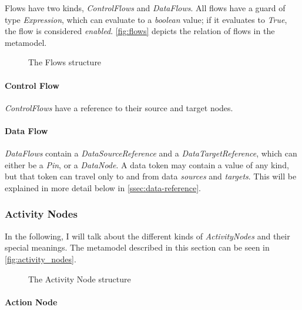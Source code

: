 Flows have two kinds, \emph{ControlFlows} and \emph{DataFlows}. All flows have a guard of type \emph{Expression}, which can evaluate to a \emph{boolean} value; if it evaluates to \emph{True}, the flow is considered \emph{enabled}. \autoref{fig:flows} depicts the relation of flows in the metamodel.

\begin{figure}[!ht]
	\centering
	
	\caption{The Flows structure}
	\label{fig:flows}
\end{figure}

\paragraph{Control Flow}

\emph{ControlFlows} have a reference to their source and target nodes.

\paragraph{Data Flow}\label{par:data_flow}

\emph{DataFlows} contain a \emph{DataSourceReference} and a \emph{DataTargetReference}, which can either be a \emph{Pin}, or a \emph{DataNode}. A data token may contain a value of any kind, but that token can travel only to and from data \emph{sources} and \emph{targets}. This will be explained in more detail below in \autoref{ssec:data-reference}.

\subsubsection*{Activity Nodes}\label{ssec:activity_nodes}

In the following, I will talk about the different kinds of \emph{ActivityNodes} and their special meanings. The metamodel described in this section can be seen in \autoref{fig:activity_nodes}.

\begin{figure}[!ht]
	\centering
	
	\caption{The Activity Node structure}
	\label{fig:activity_nodes}
\end{figure}

\paragraph{Action Node}

